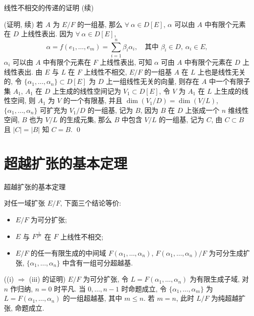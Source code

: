 
\begin{frame}{线性不相交的传递的证明 (续)}

\startproof[bg=yellow, fg=red](证明, 续)
 若 $A$ 为 $E/F$ 的一组基, 那么 $\forall\ \alpha \in D[E]$,
$\alpha$ 可以由 $A$ 中有限个元素在 $D$ 上线性表出. 因为 $\forall\ \alpha \in D[E]$,
\[
\alpha = f(e_1, \dots, e_m) = \sum_{i=1}^{n} \beta_i \alpha_i,
\quad \text{其中 } \beta_i \in D,\ \alpha_i \in E,
\]
$\alpha_i$ 可以由 $A$ 中有限个元素在 $F$ 上线性表出,
可知 $\alpha$ 可由 $A$ 中有限个元素在 $D$ 上线性表出.
 由 $E$ 与 $L$ 在 $F$ 上线性不相交,
$E/F$ 的一组基 $A$ 在 $L$ 上也是线性无关的,
令 $\{ \alpha_1, \dots, \alpha_n \} \subset D[E]$ 为 $D$ 上一组线性无关的向量,
则存在 $A$ 中一个有限子集 $A_1$, $A_1$ 在 $D$ 上生成的线性空间记为
$V_1 \subset D[E]$,
令 $V$ 为 $A_1$ 在 $L$ 上生成的线性空间, 则 $A_1$ 为 $V$ 的一个有限基,
并且 $\dim(V_1/D) = \dim(V/L)$,
$\{ \alpha_1, \dots, \alpha_n \}$ 可扩充为 $V_1/D$ 的一组基, 记为 $B$,
因为 $B$ 在 $D$ 上张成一个 $n$ 维线性空间,
$B$ 也为 $V/L$ 的生成元集, 那么 $B$ 中包含 $V/L$ 的一组基, 记为 $C$,
由 $C \subset B$ 且 $|C| = |B|$ 知 $C = B$.
\qed

\end{frame}


\section[基本定理]{超越扩张的基本定理}


\begin{frame}{超越扩张的基本定理}

\begin{thm}[超越扩张的基本定理]
对任一域扩张 $E/F$, 下面三个结论等价:
\begin{itemize}
\item[(i)] $E/F$ 为可分扩张;
\item[(ii)] $E$ 与 $F^{\frac{1}{p^{\infty}}}$ 在 $F$ 上线性不相交;
\item[(iii)] $E/F$ 的任一有限生成的中间域 $F(\alpha_1, \dots, \alpha_n)$,
  $F(\alpha_1, \dots, \alpha_n)/F$ 为可分生成扩张,
  $\{ \alpha_1, \dots, \alpha_n \}$ 中含有一组可分超越基.
\end{itemize}
\end{thm}

\startproof[bg=yellow, fg=red]((i) $\Longrightarrow$ (iii) 的证明)
$E/F$ 为可分扩张, 令 $L = F(\alpha_1, \dots, \alpha_n)$ 为有限生成子域,
对 $n$ 作归纳, $n = 0$ 时平凡.
当 $0, \dots, n-1$ 时命题成立, 令 $\{ \alpha_1, \dots, \alpha_m \}$ 为
$L = F(\alpha_1, \dots, \alpha_n)$ 的一组超越基, 其中 $m \leq n$.
若 $m = n$, 此时 $L/F$ 为纯超越扩张, 命题成立.

\end{frame}


